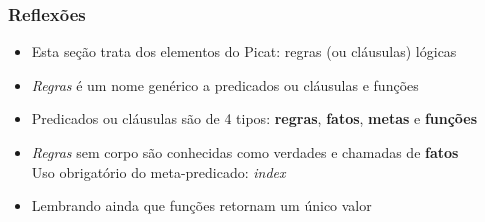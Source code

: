 \begin{frame}[fragile]
\frametitle{Reflexões}

\begin{itemize}

  \item Esta seção trata dos elementos do Picat: regras (ou cláusulas) lógicas

  \pause
  \item \textit{Regras} é um nome genérico a predicados ou cláusulas e funções
  
  \pause 
  \item Predicados ou cláusulas são de 4 tipos: \textbf{regras}, \textbf{fatos}, 
  \textbf{metas} e \textbf{funções}

    \pause
  \item \textit{Regras} sem corpo são conhecidas como verdades e chamadas de \textbf{fatos}\\
Uso obrigatório do meta-predicado:  \textit{index}
  
   \pause
  \item Lembrando ainda que funções retornam um único valor
  
\end{itemize}

\end{frame}
